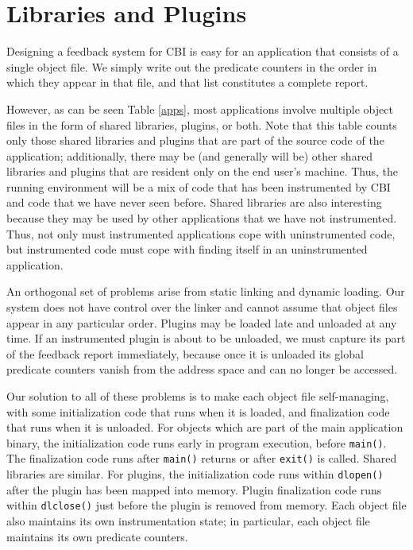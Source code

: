 \documentclass[times,10pt,twocolumn]{article}
\begin{document}
\section{Libraries and Plugins}

Designing a feedback system for CBI is easy for an application that consists of
a single object file.  We simply write out the predicate counters in the
order in which they appear in that file, and that list constitutes a complete
report.

However, as can be seen Table \ref{apps}, most applications involve
multiple object files in the form of shared libraries, plugins, or
both.  Note that this table counts only those shared libraries and
plugins that are part of the source code of the application;
additionally, there may be (and generally will be) other shared
libraries and plugins that are resident only on the end user's
machine.  Thus, the running environment will be a mix of code that has
been instrumented by CBI and code that we have never seen before.
Shared libraries are also interesting because they may be used by
other applications that we have not instrumented.  Thus, not only must
instrumented applications cope with uninstrumented code, but
instrumented code must cope with finding itself in an
uninstrumented application.

An orthogonal set of problems arise from static linking and dynamic
loading.  Our system does not have control over the linker and
cannot assume that object files appear in any particular order.
Plugins may be loaded late and unloaded at any time.  If an
instrumented plugin is about to be unloaded, we must capture its part
of the feedback report immediately, because once it is unloaded its
global predicate counters vanish from the address space and can no
longer be accessed.

Our solution to all of these problems is to make each object file
self-managing, with some initialization code that runs when it is
loaded, and finalization code that runs when it is unloaded.  For
objects which are part of the main application binary, the
initialization code runs early in program execution, before
\texttt{main()}.  The finalization code runs after \texttt{main()}
returns or after \texttt{exit()} is called.  Shared libraries are
similar.  For plugins, the initialization code runs within
\texttt{dlopen()} after the plugin has been mapped into memory.
Plugin finalization code runs within \texttt{dlclose()} just before
the plugin is removed from memory.  Each object file also maintains
its own instrumentation state; in particular, each object file maintains
its own predicate counters.
\end{document}
